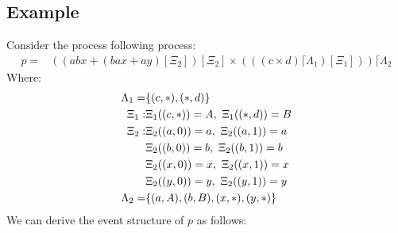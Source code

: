 \documentclass{article}
\begin{document}
\subsection{Example}
Consider the process following process:
\begin{align*}
    p = & \left(
        \left( 
            abx + 
            \left( bax + ay \right) [\Xi_2]
        \right)[\Xi_2] \times 
        \left(
            \left(
                \left( c \times d \right)\lceil \Lambda_1
            \right)[\Xi_1]
        \right)
    \right)\lceil \Lambda_2 
\end{align*}
Where:
\begin{align*}
    \Lambda_1 = & \{(c, *), (*, d)\} \\
    \Xi_1: & \Xi_1((c,*)) = A,\ \Xi_1((*, d)) = B \\
    \Xi_2: & \Xi_2((a,0)) = a,\ \Xi_2((a, 1)) = a \\
           & \Xi_2((b,0)) = b,\ \Xi_2((b, 1)) = b \\
           & \Xi_2((x,0)) = x,\ \Xi_2((x, 1)) = x \\
           & \Xi_2((y,0)) = y,\ \Xi_2((y, 1)) = y \\
    \Lambda_2 = & \{(a, A), (b, B), (x, *), (y, *)\} \\
\end{align*}
We can derive the event structure of $p$ as follows:
\end{document}
